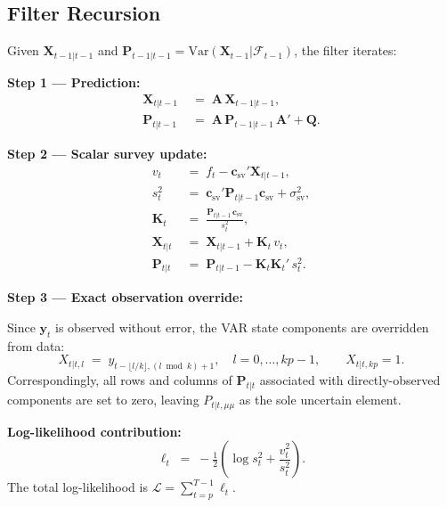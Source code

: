 \documentclass[12pt, a4paper]{article}
\newcommand{\Var}{\mathrm{Var}}
\newcommand{\bs}[1]{\boldsymbol{#1}}
\begin{document}
\subsection{Filter Recursion}

Given $\bs{X}_{t-1|t-1}$ and $\bs{P}_{t-1|t-1} = \Var(\bs{X}_{t-1}|\mathcal{F}_{t-1})$,
the filter iterates:

\medskip
\noindent\textbf{Step 1 — Prediction:}
\begin{align}
    \bs{X}_{t|t-1} &\;=\; \bs{A}\,\bs{X}_{t-1|t-1}, \label{eq:predict_x} \\
    \bs{P}_{t|t-1} &\;=\; \bs{A}\,\bs{P}_{t-1|t-1}\,\bs{A}' + \bs{Q}. \label{eq:predict_p}
\end{align}

\noindent\textbf{Step 2 — Scalar survey update:}
\begin{align}
    v_t   &\;=\; f_t - \bs{c}_{\mathrm{sv}}'\bs{X}_{t|t-1}, \label{eq:innov} \\
    s^2_t &\;=\; \bs{c}_{\mathrm{sv}}'\bs{P}_{t|t-1}\bs{c}_{\mathrm{sv}} + \sigma^2_{\mathrm{sv}}, \label{eq:s2} \\
    \bs{K}_t &\;=\; \frac{\bs{P}_{t|t-1}\,\bs{c}_{\mathrm{sv}}}{s^2_t}, \label{eq:gain} \\
    \bs{X}_{t|t} &\;=\; \bs{X}_{t|t-1} + \bs{K}_t\,v_t, \label{eq:update_x} \\
    \bs{P}_{t|t} &\;=\; \bs{P}_{t|t-1} - \bs{K}_t\bs{K}_t'\,s^2_t. \label{eq:update_p}
\end{align}

\noindent\textbf{Step 3 — Exact observation override:}

Since $\bs{y}_t$ is observed without error, the VAR state components are
overridden from data:
\begin{equation}
    X_{t|t,l} \;=\; y_{t-\lfloor l/k \rfloor, (l \bmod k)+1},
    \quad l = 0,\ldots,kp-1,
    \qquad X_{t|t,kp} = 1.
    \label{eq:override}
\end{equation}
Correspondingly, all rows and columns of $\bs{P}_{t|t}$ associated with
directly-observed components are set to zero, leaving $P_{t|t,\mu\mu}$ as
the sole uncertain element.

\medskip
\noindent\textbf{Log-likelihood contribution:}
\begin{equation}
    \ell_t \;=\; -\tfrac{1}{2}\left(\log s^2_t + \frac{v_t^2}{s^2_t}\right).
    \label{eq:ll}
\end{equation}
The total log-likelihood is $\mathcal{L} = \sum_{t=p}^{T-1}\ell_t$.
\end{document}
